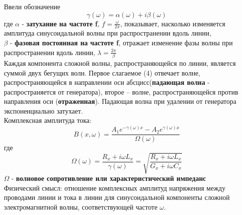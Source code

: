 \documentclass[12pt]{article}
\begin{document}
\begin{flushleft}
Ввели обозначение
\begin{equation}
\gamma(\omega)=\alpha(\omega)+i\beta(\omega)
\end{equation}
где $\alpha$ - \textbf{затухание на частоте f}, $f=\frac{\omega}{2\pi}$, показывает, насколько  изменяется амплитуда синусоидальной волны при распространении вдоль линии,\\
$\beta$ - \textbf{фазовая постоянная на частоте f}, отражает изменение фазы волны при распространении вдоль линии, $\lambda = \frac{2\pi}{\beta}$\\
\vspace{1em}
Каждая компонента сложной волны, распространяющейся по линии, является суммой двух бегущих волн. Первое слагаемое
(4) отвечает волне, распространяющейся в направлении оси абсцисс(\textbf{падающая волна} - распространяется от генератора), второе – волне, распространяющейся против направления оси (\textbf{отраженная}).  Падающая волна при удалении от генератора экспоненциально затухает.\\
Комплексная амплитуда тока:
\begin{equation}
B(x,\omega) = \frac{A_1e^{-\gamma(\omega)x} - A_2e^{\gamma(\omega)x}}{\Omega(\omega)}
\end{equation}
где
\begin{equation}
\Omega(\omega)=\frac{R_x + i\omega L_x}{\gamma(\omega)}=\sqrt{\frac{R_x + i\omega L_x}{G_x + i\omega C_x}}
\end{equation}
$\Omega$ - \textbf{волновое сопротивление или характеристический импеданс}\\
Физический смысл: отношение комплексных амплитуд
напряжения между проводами линии и тока в линии для синусоидальной компоненты сложной электромагнитной волны, соответствующей частоте $\omega$.

\end{flushleft}
\end{document}
